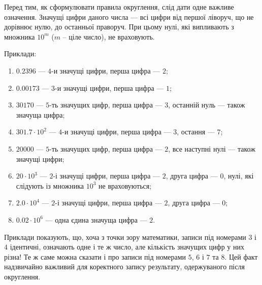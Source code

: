 \documentclass{LabBook}
\begin{document}
  Перед тим, як сформулювати правила округлення, слід дати одне важливе означення.
  Значущі цифри даного числа --- всі цифри від першої ліворуч, що не дорівнює нулю, до останньої праворуч. При цьому нулі, які випливають з множника $10^m$ ($m$ -- ціле число), не враховують.

  Приклади:

  \begin{enumerate}
    \item $0.2396$ --- $4$-и значущі цифри, перша цифра --- $2$;
    \item $0.00173$ --- $3$-и значущі цифри, перша цифра --- $1$;
    \item $30170$ --- $5$-ть значущих цифр, перша цифра --- $3$, останній нуль --- також значуща цифра;
    \item $301.7\cdot10^2$ --- $4$-и значущі цифри, перша цифра --- $3$, остання --- $7$;
    \item $20000$ --- $5$-ть значущих цифр, перша цифра --- $2$, все наступні нулі --- також значущі цифри;
    \item $20\cdot10^3$ --- $2$-і значущі цифри, перша цифра --- $2$, друга цифра --- $0$, нулі, які слідують із множника $10^3$ не враховуються;
    \item $2.0\cdot10^4$ --- $2$-і значущі цифри, перша цифра --- $2$, друга цифра --- $0$;
    \item $0.02 \cdot 10^6$ --- одна єдина значуща цифра --- $2$.
  \end{enumerate}

  Приклади показують, що, хоча з точки зору математики, записи під номерами $3$ і $4$ ідентичні, означають одне і те ж число, але кількість значущих цифр у них різна! Те ж саме можна сказати і про записи під номерами $5$, $6$ і $7$ та $8$. Цей факт надзвичайно важливий для коректного запису результату, одержуваного після округлення.
\end{document}
